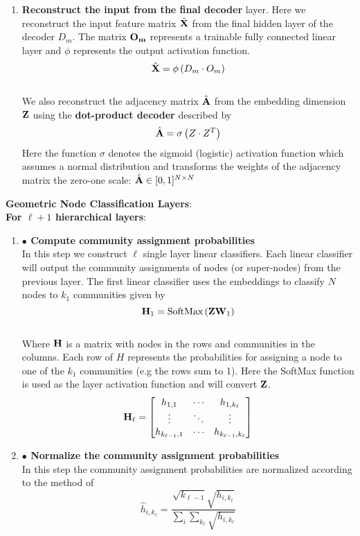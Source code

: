 \documentclass[a4paper,12pt]{article}
\newcommand{\forceindent}{\leavevmode{\parindent=2em\indent}}
\begin{document}
\begin{itemize}
\begin{enumerate}
{\begin{enumerate}
				\item[]{\textbf{Reconstruct the input from the final decoder} layer. Here we reconstruct the input feature matrix $\hat{\bf X}$ from the final hidden layer of the decoder $D_m$. The matrix ${\bf O_m}$ represents a trainable fully connected linear layer and $\phi$ represents the output activation function. 
					\[\hat{\bf X} = \phi\left(D_m\cdot O_m\right)\]
					\\
					We also reconstruct the adjacency matrix $\hat{\bf A}$ from the embedding dimension $\bf Z$ using the \textbf{dot-product decoder} described by \cite{kipf2016variational,zhou2023community}
					\[\hat{\bf A} = \sigma\left(Z\cdot Z^T\right) \]
					Here the function $\sigma$ denotes the sigmoid (logistic) activation function which assumes a normal distribution and transforms the weights of the adjacency matrix the zero-one scale: $\hat{\bf A} \in [0,1]^{N\times N}$
				}
					
			\end{enumerate}
			\forceindent \textbf{Geometric Node Classification Layers}: \\
			\forceindent \textbf{For $\ell+1$ hierarchical layers}:
			\begin{enumerate}
				\item[]{\textbf{$\bullet$ Compute community assignment probabilities} 
					\\
					In this step we construct $\ell$ single layer linear classifiers. Each linear classifier will output the community assignments of nodes (or super-nodes) from the previous layer. The first linear classifier uses the embeddings to classify $N$ nodes to $k_1$ communities given by
					\[{\bf H}_{1} = \text{SoftMax}\left({\bf Z}{\bf W}_{1}\right) \]
					\\ 
					Where $\bf H$ is a matrix with nodes in the rows and communities in the columns. Each row of $H$ represents the probabilities for assigning a node to one of the $k_1$ communities (e.g the rows sum to 1). Here the SoftMax function is used as the layer activation function and will convert ${\bf Z}$. 
					\[{\bf H}_\ell = \begin{bmatrix}
						h_{1, 1} & \cdots & h_{1, k_\ell} \\
						\vdots  & \ddots & \vdots \\
						h_{k_{\ell - 1}, 1} & \cdots & h_{k_{\ell -1}, k_\ell} 
					\end{bmatrix}\]}
				
				\item[]{\textbf{$\bullet$ Normalize the community assignment probabilities}
					\\
					In this step the community assignment probabilities are normalized according to the method of %
					\[ \hat{h}_{i,k_\ell} = \frac{\sqrt{k_{\ell-1}} \sqrt{h_{i, k_\ell}}}{\sum_i \sum_{k_\ell} \sqrt{h_{i, k_\ell}}}\]
					
}
\end{enumerate}}
\end{enumerate}
\end{itemize}
\end{document}

